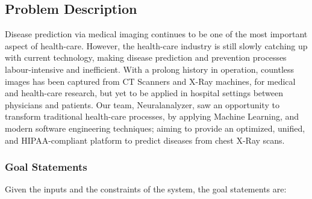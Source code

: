 \documentclass[12pt]{article}
\begin{document}
\subsection{Problem Description}
Disease prediction via medical imaging continues to be one of the most important aspect of health-care. However, the health-care industry is still slowly catching up with current technology, making disease prediction and prevention processes labour-intensive and inefficient. With a prolong history in operation, countless images has been captured from CT Scanners and X-Ray machines, for medical and health-care research, but yet to be applied in hospital settings between physicians and patients.
\newline
Our team, Neuralanalyzer, saw an opportunity to transform traditional health-care processes, by applying Machine Learning, and modern software engineering techniques; aiming to provide an optimized, unified, and HIPAA-compliant platform to predict diseases from chest X-Ray scans.
\newpage
\subsubsection{Goal Statements}
\noindent Given the inputs and the constraints of the system, the goal statements are:
\end{document}
